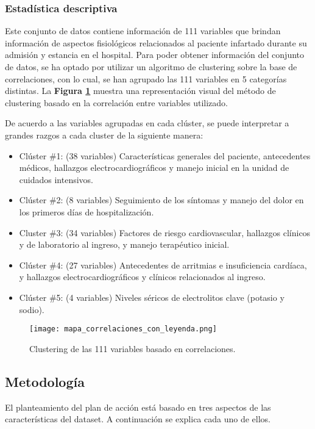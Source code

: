 \documentclass[conference]{IEEEtran}
\begin{document}
\subsubsection{\textbf{Estadística descriptiva}}\label{edes}
Este conjunto de datos contiene información de 111 variables que brindan información de aspectos fisiológicos relacionados al paciente infartado durante su admisión y estancia  en el hospital. Para poder obtener información del conjunto de datos, se ha optado por utilizar un algoritmo de clustering sobre la base de correlaciones, con lo cual, se han agrupado las 111 variables en 5 categorías distintas. La \textbf{Figura \ref{fig:fig1}} muestra una representación visual del método de clustering basado en la correlación entre variables utilizado.

De acuerdo a las variables agrupadas en cada clúster, se puede interpretar a grandes razgos a cada cluster de la siguiente manera:

\begin{itemize}
    \item Clúster \#1: (38 variables) Características generales del paciente, antecedentes médicos, hallazgos electrocardiográficos y manejo inicial en la unidad de cuidados intensivos.
    \item Clúster \#2: (8 variables) Seguimiento de los síntomas y manejo del dolor en los primeros días de hospitalización.
    \item Cluster \#3: (34 variables) Factores de riesgo cardiovascular, hallazgos clínicos y de laboratorio al ingreso, y manejo terapéutico inicial. 
    \item Clúster \#4: (27 variables) Antecedentes de arritmias e insuficiencia cardíaca, y hallazgos electrocardiográficos y clínicos relacionados al ingreso.
    \item Clúster \#5: (4 variables) Niveles séricos de electrolitos clave (potasio y sodio).
\end{itemize}

\begin{figure}[htbp!]
  \centering
  \texttt{[image: mapa\_correlaciones\_con\_leyenda.png]} 
  \caption{Clustering de las 111 variables basado en correlaciones.}
  \label{fig:fig1}
\end{figure}

\subsection{\textbf{Metodología}}
El planteamiento del plan de acción está basado en tres aspectos de las características del dataset. A continuación se explica cada uno de ellos. 
\end{document}
